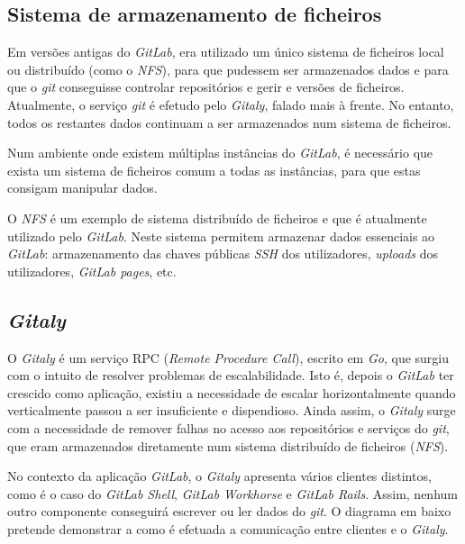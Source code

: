 \documentclass[12pt,a4paper]{article}
\begin{document}
\subsection{Sistema de armazenamento de ficheiros}

Em versões antigas do \emph{GitLab}, era utilizado um único sistema de ficheiros local ou distribuído (como o \emph{NFS}), para que pudessem ser armazenados dados e para que o \emph{git} conseguisse controlar repositórios e gerir e versões de ficheiros. Atualmente, o serviço \emph{git} é efetudo pelo \emph{Gitaly}, falado mais à frente. No entanto, todos os restantes dados continuam a ser armazenados num sistema de ficheiros.

Num ambiente onde existem múltiplas instâncias do \emph{GitLab}, é necessário que exista um sistema de ficheiros comum a todas as instâncias, para que estas consigam manipular dados. 

O \emph{NFS} é um exemplo de sistema distribuído de ficheiros e que é atualmente utilizado pelo \emph{GitLab}. Neste sistema permitem armazenar dados essenciais ao \emph{GitLab}: armazenamento das chaves públicas \emph{SSH} dos utilizadores, \emph{uploads} dos utilizadores, \emph{GitLab pages}, etc.


\subsection{\emph{Gitaly}}

O \emph{Gitaly} é um serviço RPC (\emph{Remote Procedure Call}), escrito em \textit{Go}, que surgiu com o intuito de resolver problemas de escalabilidade. Isto é, depois o \emph{GitLab} ter crescido como aplicação, existiu a necessidade  de escalar horizontalmente quando verticalmente passou a ser insuficiente e dispendioso. Ainda assim, o \emph{Gitaly} surge com a necessidade de remover falhas no acesso aos repositórios e serviços do \emph{git}, que eram armazenados diretamente num sistema distribuído de ficheiros (\emph{NFS}).

No contexto da aplicação \emph{GitLab}, o \emph{Gitaly} apresenta vários clientes distintos, como é o caso do \emph{GitLab Shell}, \emph{GitLab Workhorse} e \emph{GitLab Rails}. Assim, nenhum outro componente conseguirá escrever ou ler dados do \emph{git}. O diagrama em baixo pretende demonstrar a como é efetuada a comunicação entre clientes e o \emph{Gitaly}.
\end{document}

